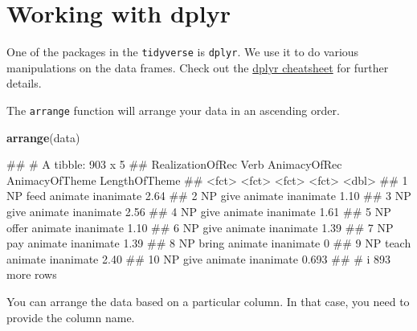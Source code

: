 \documentclass[
]{book}
\newenvironment{Shaded}{\begin{snugshade}}{\end{snugshade}}
\newcommand{\FunctionTok}[1]{\textcolor[rgb]{0.13,0.29,0.53}{\textbf{#1}}}
\newcommand{\NormalTok}[1]{#1}
\begin{document}
\section{Working with dplyr}\label{working-with-dplyr}

One of the packages in the \texttt{tidyverse} is \texttt{dplyr}. We use it to do various manipulations on the data frames. Check out the \href{https://nyu-cdsc.github.io/learningr/assets/data-transformation.pdf}{dplyr cheatsheet} for further details.

The \texttt{arrange} function will arrange your data in an ascending order.

\begin{Shaded}
\begin{Highlighting}[]
\FunctionTok{arrange}\NormalTok{(data)}
\end{Highlighting}
\end{Shaded}

\begin{Shaded}
\begin{Highlighting}[]
\NormalTok{\#\# \# A tibble: 903 x 5}
\NormalTok{\#\#    RealizationOfRec Verb  AnimacyOfRec AnimacyOfTheme LengthOfTheme}
\NormalTok{\#\#    \textless{}fct\textgreater{}            \textless{}fct\textgreater{} \textless{}fct\textgreater{}        \textless{}fct\textgreater{}                  \textless{}dbl\textgreater{}}
\NormalTok{\#\#  1 NP               feed  animate      inanimate              2.64 }
\NormalTok{\#\#  2 NP               give  animate      inanimate              1.10 }
\NormalTok{\#\#  3 NP               give  animate      inanimate              2.56 }
\NormalTok{\#\#  4 NP               give  animate      inanimate              1.61 }
\NormalTok{\#\#  5 NP               offer animate      inanimate              1.10 }
\NormalTok{\#\#  6 NP               give  animate      inanimate              1.39 }
\NormalTok{\#\#  7 NP               pay   animate      inanimate              1.39 }
\NormalTok{\#\#  8 NP               bring animate      inanimate              0    }
\NormalTok{\#\#  9 NP               teach animate      inanimate              2.40 }
\NormalTok{\#\# 10 NP               give  animate      inanimate              0.693}
\NormalTok{\#\# \# i 893 more rows}
\end{Highlighting}
\end{Shaded}

You can arrange the data based on a particular column. In that case, you need to provide the column name.
\end{document}

